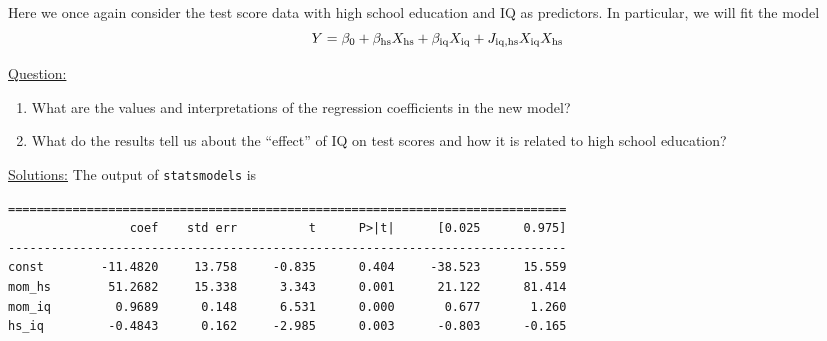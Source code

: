 \begin{example}\label{ex:testscores}
Here we once again consider the test score data with high school education and IQ as predictors. In particular, we will fit the model
\begin{equation*}
Y = \beta_0 + \beta_{\rm hs}X_{\rm hs} + \beta_{\rm iq}X_{\rm iq} + J_{\rm iq,hs}X_{\rm iq}X_{\rm hs}
\end{equation*}


\noindent
\underline{Question:} 
\begin{enumerate}[label=(\alph*)]
\item What are the values and interpretations of the regression coefficients in the new model?
\item What do the results tell us about the ``effect'' of IQ on test scores and how it is related to high school education? \\
\end{enumerate}

\noindent
\underline{Solutions:} 
The output of \verb!statsmodels! is 
\begin{Verbatim}
==============================================================================
                 coef    std err          t      P>|t|      [0.025      0.975]
------------------------------------------------------------------------------
const        -11.4820     13.758     -0.835      0.404     -38.523      15.559
mom_hs        51.2682     15.338      3.343      0.001      21.122      81.414
mom_iq         0.9689      0.148      6.531      0.000       0.677       1.260
hs_iq         -0.4843      0.162     -2.985      0.003      -0.803      -0.165
\end{Verbatim}
\vspace{.4cm}


\end{example}
